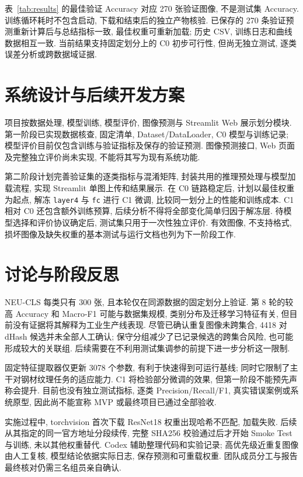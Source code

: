 \documentclass[letterpaper, 10 pt, conference]{ieeeconf}
\begin{document}
表~\ref{tab:results} 的最佳验证 Accuracy 对应 270 张验证图像, 不是测试集 Accuracy. 训练循环耗时不包含启动, 下载和结束后的独立产物核验. 已保存的 270 条验证预测重新计算后与总结指标一致, 最佳权重可重新加载; 历史 CSV, 训练日志和曲线数据相互一致. 当前结果支持固定划分上的 C0 初步可行性, 但尚无独立测试, 逐类误差分析或跨数据域证据.

\section{系统设计与后续开发方案}
项目按数据处理, 模型训练, 模型评价, 图像预测与 Streamlit Web 展示划分模块. 第一阶段已实现数据核查, 固定清单, Dataset/DataLoader, C0 模型与训练记录; 模型评价目前仅包含训练与验证指标及保存的验证预测. 图像预测接口, Web 页面及完整独立评价尚未实现, 不能将其写为现有系统功能.

第二阶段计划完善验证集的逐类指标与混淆矩阵, 封装共用的推理预处理与模型加载流程, 实现 Streamlit 单图上传和结果展示. 在 C0 链路稳定后, 计划以最佳权重为起点, 解冻 \texttt{layer4} 与 \texttt{fc} 进行 C1 微调, 比较同一划分上的性能和训练成本. C1 相对 C0 还包含额外训练预算, 后续分析不得将全部变化简单归因于解冻层. 待模型选择和评价协议确定后, 测试集只用于一次性独立评价. 有效图像, 不支持格式, 损坏图像及缺失权重的基本测试与运行文档也列为下一阶段工作.

\section{讨论与阶段反思}
NEU-CLS 每类只有 300 张, 且本轮仅在同源数据的固定划分上验证. 第 8 轮的较高 Accuracy 和 Macro-F1 可能与数据集规模, 类别分布及迁移学习特征有关, 但目前没有证据将其解释为工业生产线表现. 尽管已确认重复图像未跨集合, 4418 对 dHash 候选并未全部人工确认; 保守分组减少了已记录候选的跨集合风险, 也可能形成较大的关联组. 后续需要在不利用测试集调参的前提下进一步分析这一限制.

固定特征提取器仅更新 3078 个参数, 有利于快速得到可运行基线; 同时它限制了主干对钢材纹理任务的适应能力. C1 将检验部分微调的效果, 但第一阶段不能预先声称会提升. 目前也没有独立测试指标, 逐类 Precision/Recall/F1, 真实错误案例或系统原型, 因此尚不能宣称 MVP 或最终项目已通过全部验收.

实施过程中, torchvision 首次下载 ResNet18 权重出现哈希不匹配, 加载失败. 后续从其指定的同一官方地址分段续传, 完整 SHA256 校验通过后才开始 Smoke Test 与训练, 未以其他权重替代. Codex 辅助整理代码和实验记录; 高优先级近重复图像由人工复核, 模型结论依据实际日志, 保存预测和可重载权重. 团队成员分工与报告最终核对仍需三名组员亲自确认.
\end{document}
